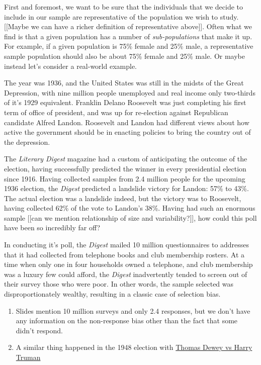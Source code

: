 \documentclass[
]{book}
\providecommand{\tightlist}{%
  \setlength{\itemsep}{0pt}\setlength{\parskip}{0pt}}
\theoremstyle{definition}
\theoremstyle{definition}
\theoremstyle{definition}
\theoremstyle{remark}
\begin{document}
First and foremost, we want to be sure that the individuals that we decide to include in our sample are representative of the population we wish to study. {[}{[}Maybe we can have a richer definition of representative above{]}{]}. Often what we find is that a given population has a number of \emph{sub-populations} that make it up. For example, if a given population is 75\% female and 25\% male, a representative sample population should also be about 75\% female and 25\% male. Or maybe instead let's consider a real-world example.

The year was 1936, and the United States was still in the midsts of the Great Depression, with nine million people unemployed and real income only two-thirds of it's 1929 equivalent. Franklin Delano Roosevelt was just completing his first term of office of president, and was up for re-election against Republican candidate Alfred Landon. Roosevelt and Landon had different views about how active the government should be in enacting policies to bring the country out of the depression.

The \emph{Literary Digest} magazine had a custom of anticipating the outcome of the election, having successfully predicted the winner in every presidential election since 1916. Having collected samples from 2.4 million people for the upcoming 1936 election, the \emph{Digest} predicted a landslide victory for Landon: 57\% to 43\%. The actual election was a landslide indeed, but the victory was to Roosevelt, having collected 62\% of the vote to Landon's 38\%. Having had such an enormous sample {[}{[}can we mention relationship of size and variability?{]}{]}, how could this poll have been so incredibly far off?

In conducting it's poll, the \emph{Digest} mailed 10 million questionnaires to addresses that it had collected from telephone books and club membership rosters. At a time when only one in four households owned a telephone, and club membership was a luxury few could afford, the \emph{Digest} inadvertently tended to screen out of their survey those who were poor. In other words, the sample selected was disproportionately wealthy, resulting in a classic case of selection bias.

\begin{enumerate}
\def\labelenumi{\arabic{enumi}.}
\tightlist
\item
  Slides mention 10 million surveys and only 2.4 responses, but we don't have any information on the non-response bias other than the fact that some didn't respond.
\item
  A similar thing happened in the 1948 election with \href{https://medium.com/@ODSC/dewey-defeats-truman-how-sampling-bias-can-ruin-your-model-f4f67989709e}{Thomas Dewey vs Harry Truman}
\end{enumerate}
\end{document}
